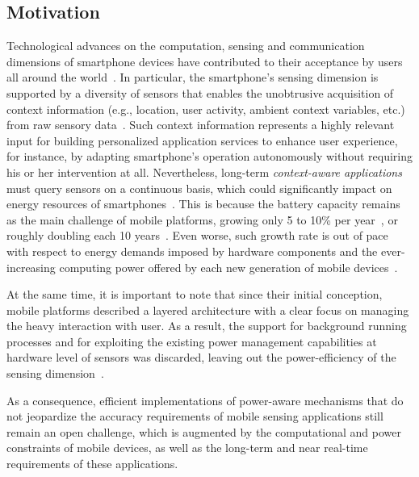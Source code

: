 \documentclass[ENG,PhD]{cinvestav}
\begin{document}
\subsection{Motivation}
Technological advances on the computation, sensing and communication dimensions of smartphone devices have contributed to their acceptance by users all around the world~\cite{Campbell2012}.
In particular, the smartphone's sensing dimension is supported by a diversity of sensors that enables the unobtrusive acquisition of context information (e.g., location, user activity, ambient context variables, etc.) from raw sensory data~\cite{Lane2010}.
Such context information represents a highly relevant input for building personalized application services to enhance user experience, for instance, by adapting smartphone's operation autonomously without requiring his or her intervention at all.
Nevertheless, long-term \emph{context-aware applications} must query sensors on a continuous basis, which could significantly impact on energy resources of smartphones~\cite{Macias2013}.
This is because the battery capacity remains as the main challenge of mobile platforms, growing only 5 to 10\% per year~\cite{Ma2012,Evarts2015}, or roughly doubling each 10 years~\cite{Tom2015}.
Even worse, such growth rate is out of pace with respect to energy demands imposed by hardware components and the ever-increasing computing power offered by each new generation of mobile devices~\cite{Yurur2015}.

At the same time, it is important to note that since their initial conception, mobile platforms described a layered architecture with a clear focus on managing the heavy interaction with user.
As a result, the support for background running processes and for exploiting the existing power management capabilities at hardware level of sensors was discarded, leaving out the power-efficiency of the sensing dimension~\cite{Priyantha2011}.

As a consequence, efficient implementations of power-aware mechanisms that do not jeopardize the accuracy requirements of mobile sensing applications still remain an open challenge, which is augmented by the computational and power constraints of mobile devices, as well as the long-term and near real-time requirements of these applications.
\end{document}
